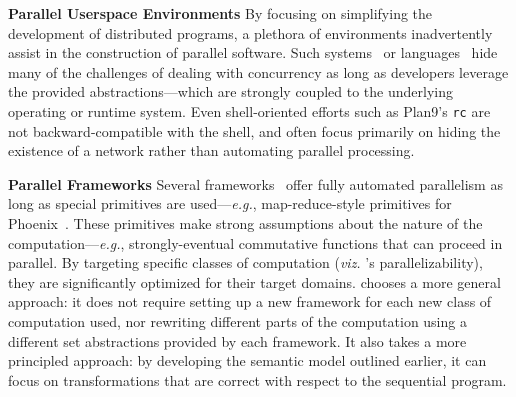 \documentclass[letterpaper,twocolumn,10pt]{article}
\newcommand{\eg}{{\em e.g.}, }
\newcommand{\heading}[1]{\vspace{4pt}\noindent\textbf{#1}\enspace}
\newcommand{\ttt}[1]{\texttt{#1}}
\begin{document}
\heading{Parallel Userspace Environments}
By focusing on simplifying the development of distributed programs, a plethora of environments inadvertently assist in the construction of parallel software.
Such systems~\cite{ousterhout1988sprite, mullender1990amoeba, pike1990plan9, barak1998mosix} or languages~\cite{erlang:96, acute:05, mace:07, cloudhaskell:11} hide many of the challenges of dealing with concurrency as long as developers leverage the provided abstractions---which are strongly coupled to the underlying operating or runtime system.
Even shell-oriented efforts such as Plan9's \ttt{rc} are not backward-compatible with the \unix shell, and often focus primarily on hiding the existence of a network rather than automating parallel processing.

\heading{Parallel Frameworks}
Several frameworks~\cite{streamit:02, brook:04, phoenix:11, raftlib:17} offer fully automated parallelism as long as special primitives are used---\eg map-reduce-style primitives for Phoenix~\cite{phoenix:11}.
These primitives make strong assumptions about the nature of the computation---\eg strongly-eventual commutative functions that can proceed in parallel.
By targeting specific classes of computation (\emph{viz.} \sys's parallelizability), they are significantly optimized for their target domains.
\sys chooses a more general approach:
   it does not require setting up a new framework for each new class of computation used, nor rewriting different parts of the computation using a different set abstractions provided by each framework.
It also takes a more principled approach:
  by developing the semantic model outlined earlier, it can focus on transformations that are correct with respect to the sequential program.

\end{document}
